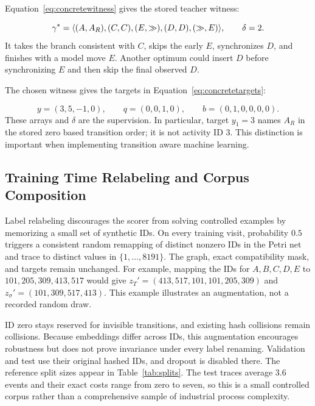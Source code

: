 \begin{revised}Equation~\eqref{eq:concretewitness} gives the stored teacher witness:\end{revised}
\begin{equation}
 \gamma^*=\langle(A,A_R),(C,C),(E,\gg),(D,D),(\gg,E)\rangle,
 \qquad\delta=2.
 \label{eq:concretewitness}
\end{equation}
It takes the branch consistent with $C$, skips the early $E$, synchronizes $D$, and finishes with a model move $E$. Another optimum could insert $D$ before synchronizing $E$ and then skip the final observed $D$. \begin{revised}The chosen witness gives the targets in Equation~\eqref{eq:concretetargets}:\end{revised}
\begin{equation}
 y=(3,5,-1,0),\qquad q=(0,0,1,0),\qquad b=(0,1,0,0,0,0).
 \label{eq:concretetargets}
\end{equation}
These arrays and $\delta$ are the supervision. In particular, target $y_1=3$ names $A_R$ in the stored zero based transition order; it is not activity ID 3. This distinction is important when implementing transition aware machine learning.

\subsection{Training Time Relabeling and Corpus Composition}

Label relabeling discourages the scorer from solving controlled examples by memorizing a small set of synthetic IDs. On every training visit, probability $0.5$ triggers a consistent random remapping of distinct nonzero IDs in the Petri net and trace to distinct values in $\{1,\ldots,8191\}$. The graph, exact compatibility mask, and targets remain unchanged. For example, mapping the IDs for $A,B,C,D,E$ to $101,205,309,413,517$ would give $z_T'=(413,517,101,101,205,309)$ and $z_\sigma'=(101,309,517,413)$. This example illustrates an augmentation, not a recorded random draw.

ID zero stays reserved for invisible transitions, and existing hash collisions remain collisions. Because embeddings differ across IDs, this augmentation encourages robustness but does not prove invariance under every label renaming. Validation and test use their original hashed IDs, and dropout is disabled there. The reference split sizes appear in Table~\ref{tab:splits}. The test traces average 3.6 events and their exact costs range from zero to seven, so this is a small controlled corpus rather than a comprehensive sample of industrial process complexity.

